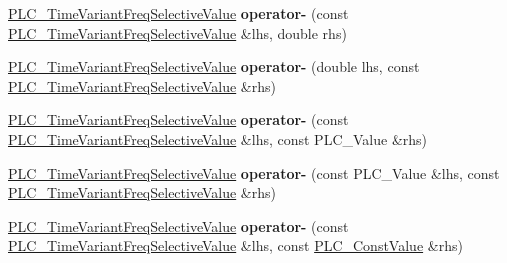 \begin{DoxyCompactItemize}
\item 
\hypertarget{classns3_1_1PLC__TimeVariantFreqSelectiveValue_aff4dffdd96e4cf406fccf4ec28a94d2f}{\hyperlink{classns3_1_1PLC__TimeVariantFreqSelectiveValue}{\-P\-L\-C\-\_\-\-Time\-Variant\-Freq\-Selective\-Value} {\bfseries operator-\/} (const \hyperlink{classns3_1_1PLC__TimeVariantFreqSelectiveValue}{\-P\-L\-C\-\_\-\-Time\-Variant\-Freq\-Selective\-Value} \&lhs, double rhs)}\label{classns3_1_1PLC__TimeVariantFreqSelectiveValue_aff4dffdd96e4cf406fccf4ec28a94d2f}

\item 
\hypertarget{classns3_1_1PLC__TimeVariantFreqSelectiveValue_a6e7324a517d17f5d91e3c1a9d9ac5063}{\hyperlink{classns3_1_1PLC__TimeVariantFreqSelectiveValue}{\-P\-L\-C\-\_\-\-Time\-Variant\-Freq\-Selective\-Value} {\bfseries operator-\/} (double lhs, const \hyperlink{classns3_1_1PLC__TimeVariantFreqSelectiveValue}{\-P\-L\-C\-\_\-\-Time\-Variant\-Freq\-Selective\-Value} \&rhs)}\label{classns3_1_1PLC__TimeVariantFreqSelectiveValue_a6e7324a517d17f5d91e3c1a9d9ac5063}

\item 
\hypertarget{classns3_1_1PLC__TimeVariantFreqSelectiveValue_aeb22eabbeb8e109d22c945aeeadb24a3}{\hyperlink{classns3_1_1PLC__TimeVariantFreqSelectiveValue}{\-P\-L\-C\-\_\-\-Time\-Variant\-Freq\-Selective\-Value} {\bfseries operator-\/} (const \hyperlink{classns3_1_1PLC__TimeVariantFreqSelectiveValue}{\-P\-L\-C\-\_\-\-Time\-Variant\-Freq\-Selective\-Value} \&lhs, const \-P\-L\-C\-\_\-\-Value \&rhs)}\label{classns3_1_1PLC__TimeVariantFreqSelectiveValue_aeb22eabbeb8e109d22c945aeeadb24a3}

\item 
\hypertarget{classns3_1_1PLC__TimeVariantFreqSelectiveValue_ae867c05d369042cc37f6df667ba308be}{\hyperlink{classns3_1_1PLC__TimeVariantFreqSelectiveValue}{\-P\-L\-C\-\_\-\-Time\-Variant\-Freq\-Selective\-Value} {\bfseries operator-\/} (const \-P\-L\-C\-\_\-\-Value \&lhs, const \hyperlink{classns3_1_1PLC__TimeVariantFreqSelectiveValue}{\-P\-L\-C\-\_\-\-Time\-Variant\-Freq\-Selective\-Value} \&rhs)}\label{classns3_1_1PLC__TimeVariantFreqSelectiveValue_ae867c05d369042cc37f6df667ba308be}

\item 
\hypertarget{classns3_1_1PLC__TimeVariantFreqSelectiveValue_ab9a8d0c54a5bd3a6fe25d9844cd7c0bc}{\hyperlink{classns3_1_1PLC__TimeVariantFreqSelectiveValue}{\-P\-L\-C\-\_\-\-Time\-Variant\-Freq\-Selective\-Value} {\bfseries operator-\/} (const \hyperlink{classns3_1_1PLC__TimeVariantFreqSelectiveValue}{\-P\-L\-C\-\_\-\-Time\-Variant\-Freq\-Selective\-Value} \&lhs, const \hyperlink{classns3_1_1PLC__ConstValue}{\-P\-L\-C\-\_\-\-Const\-Value} \&rhs)}\label{classns3_1_1PLC__TimeVariantFreqSelectiveValue_ab9a8d0c54a5bd3a6fe25d9844cd7c0bc}


\end{DoxyCompactItemize}
